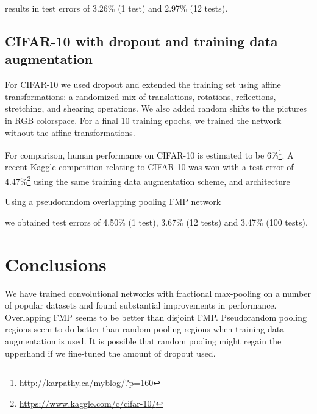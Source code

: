 \documentclass[english]{article}
\begin{document}
results in test errors of 3.26\% (1 test) and 2.97\% (12 tests).

\subsection{CIFAR-10 with dropout and training data augmentation}
For CIFAR-10 we used dropout and extended the training set using affine transformations: a randomized mix of translations,
rotations, reflections, stretching, and shearing operations.
We also added random shifts to the pictures in RGB colorspace. For a final 10 training epochs, we trained the network without the affine transformations.


For comparison, human performance on
CIFAR-10 is estimated to be 6\%\footnote{\url{http://karpathy.ca/myblog/?p=160}}.
A recent Kaggle competition relating to CIFAR-10 was won with a test
error of 4.47\%\footnote{\url{https://www.kaggle.com/c/cifar-10/}} using the same training data augmentation scheme, and architecture

Using a pseudorandom overlapping pooling FMP network

we obtained test errors of
4.50\% (1 test), 3.67\% (12 tests) and 3.47\% (100 tests).



\section{Conclusions}

We have trained convolutional networks with fractional max-pooling
on a number of popular datasets and found substantial improvements
in performance. Overlapping FMP seems to be better than disjoint FMP.
Pseudorandom pooling regions seem to do better than random pooling
regions when training data augmentation is used. It is possible that random pooling might
regain the upperhand if we fine-tuned the amount of dropout used.
\end{document}
